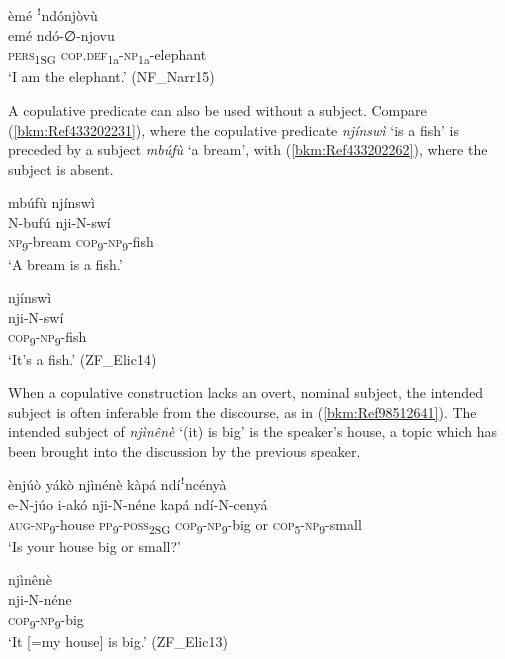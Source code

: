 \ea
\label{bkm:Ref444602246}
èmé ꜝndónjòvù\\
\gll emé    ndó-∅-njovu\\
\textsc{pers}\textsubscript{1SG}  \textsc{cop}.\textsc{def}\textsubscript{1a}-\textsc{np}\textsubscript{1a}-elephant\\
\glt ‘I am the elephant.’ (NF\_Narr15)
\z

A copulative predicate can also be used without a subject. Compare (\ref{bkm:Ref433202231}), where the copulative predicate \textit{njínswì} ‘is a fish’ is preceded by a subject \textit{mbúfù} ‘a bream’, with (\ref{bkm:Ref433202262}), where the subject is absent.

\ea
\label{bkm:Ref433202231}
mbúfù njínswì\\
\gll N-bufú  nji-N-swí\\
\textsc{np}\textsubscript{9}-bream  \textsc{cop}\textsubscript{9}-\textsc{np}\textsubscript{9}-fish\\
\glt ‘A bream is a fish.’
\z

\ea
\label{bkm:Ref433202262}
\glll \label{bkm:Ref98775427}njínswì\\
nji-N-swí\\
\textsc{cop}\textsubscript{9}-\textsc{np}\textsubscript{9}-fish\\
\glt ‘It’s a fish.’ (ZF\_Elic14)
\z

When a copulative construction lacks an overt, nominal subject, the intended subject is often inferable from the discourse, as in (\ref{bkm:Ref98512641}). The intended subject of \textit{njìnênè} ‘(it) is big’ is the speaker’s house, a topic which has been brought into the discussion by the previous speaker.

\ea
\label{bkm:Ref98512641}
\ea
ènjúò yákò njìnénè kàpá ndíꜝncényà\\
\gll e-N-júo    i-akó    nji-N-néne  kapá  ndí-N-cenyá\\
\textsc{aug}-\textsc{np}\textsubscript{9}-house  \textsc{pp}\textsubscript{9}-\textsc{poss}\textsubscript{2SG}  \textsc{cop}\textsubscript{9}-\textsc{np}\textsubscript{9}-big  or  \textsc{cop}\textsubscript{5}-\textsc{np}\textsubscript{9}-small\\
\glt ‘Is your house big or small?’

\ex
\glll njìnênè\\
nji-N-néne\\
\textsc{cop}\textsubscript{9}-\textsc{np}\textsubscript{9}-big\\
\glt ‘It [=my house] is big.’ (ZF\_Elic13)
\z\z

